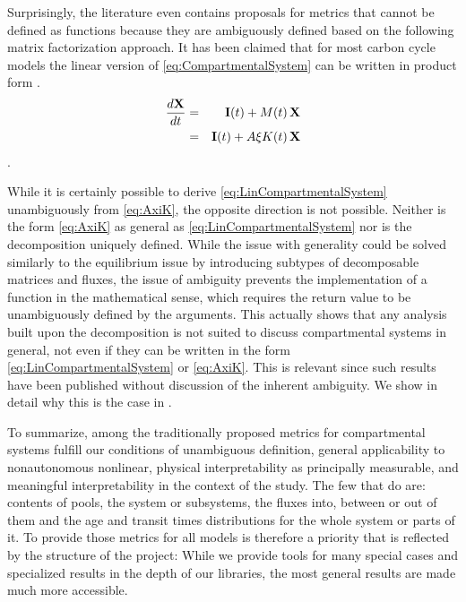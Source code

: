 Surprisingly, the literature even contains proposals for metrics that cannot be defined as functions because they are ambiguously defined based on the following matrix factorization approach.  
It has been claimed that for most carbon cycle models the linear version of \eqref{eq:CompartmentalSystem} can be written in product form 
\citep{Xia2013GCB, Luo2017Biogeosciences, zhou_sources_2018, zhou_traceability_2021, LiaoDisentangling2022,Luo2022, luo_land_2022}.
\begin{eqnarray} 
  \frac{d\mathbf{X}}{dt} &=& \mathbf{I}(t) + M(t) \, \mathbf{X} 
  \label{eq:LinCompartmentalSystem} 
  \\
                &=& \mathbf{I}(t) + A \xi K(t) \, \mathbf{X}
  \label{eq:AxiK}
\end{eqnarray}
.

While it is certainly possible to derive \eqref{eq:LinCompartmentalSystem} unambiguously from \eqref{eq:AxiK}, the opposite direction is not possible. Neither is the form \eqref{eq:AxiK} as general as \eqref{eq:LinCompartmentalSystem} 
nor is the decomposition uniquely defined.
While the issue with generality could be solved similarly to the equilibrium
issue by introducing subtypes of decomposable matrices and fluxes, the issue of
ambiguity prevents the implementation of a function in the mathematical sense, which requires the return value to be unambiguously defined by the arguments.
This actually shows that any analysis built upon the decomposition is not
suited to discuss compartmental systems in general, not even if they can be
written in the form \eqref{eq:LinCompartmentalSystem} or \eqref{eq:AxiK}. This is relevant since such results have been published without discussion of the inherent ambiguity. We show in detail why this is the case in . 

To summarize, among the traditionally proposed 
metrics for compartmental systems fulfill our conditions of unambiguous definition, general applicability to nonautonomous nonlinear, physical interpretability as principally measurable, and meaningful interpretability in the context of the study. 
The few that do are:
contents of pools, the system or subsystems, the fluxes into, between or out of them and the age and transit times distributions for the whole system or parts of it.  
To provide those metrics for all models is therefore a priority that is reflected by the structure of the project:
While we provide tools for many special cases and specialized results in the depth of our libraries, the most general results
are made much more accessible.

